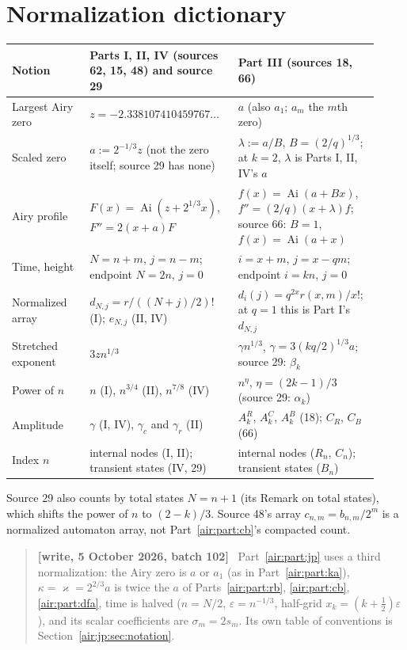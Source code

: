 \documentclass[11pt,letterpaper]{article}
\numberwithin{equation}{section}
\theoremstyle{remark}
\newcommand{\Ai}{\operatorname{Ai}}
\newcommand{\eps}{\varepsilon}
\newenvironment{writenotejp}{\par\smallskip\begin{quote}\small\textbf{[write, 5 October 2026, batch 102]}\ }{\end{quote}\smallskip}
\begin{document}
\section*{Normalization dictionary}
\label{air:guide:normalization}
\begin{center}
\small
\begin{tabular}{@{}>{\raggedright\arraybackslash}p{0.2\linewidth}>{\raggedright\arraybackslash}p{0.36\linewidth}>{\raggedright\arraybackslash}p{0.36\linewidth}@{}}
\toprule
Notion & Parts I, II, IV (sources 62, 15, 48) and source 29 & Part III (sources 18, 66)\\
\midrule
Largest Airy zero & $z=-2.338107410459767\ldots$ & $a$ (also $a_1$; $a_m$ the $m$th zero)\\
Scaled zero & $a:=2^{-1/3}z$ (not the zero itself; source 29 has none) & $\lambda:=a/B$, $B=(2/q)^{1/3}$; at $k=2$, $\lambda$ is Parts I, II, IV's $a$\\
Airy profile & $F(x)=\Ai(z+2^{1/3}x)$, $F''=2(x+a)F$ & $f(x)=\Ai(a+Bx)$, $f''=(2/q)(x+\lambda)f$; source 66: $B=1$, $f(x)=\Ai(a+x)$\\
Time, height & $N=n+m$, $j=n-m$; endpoint $N=2n$, $j=0$ & $i=x+m$, $j=x-qm$; endpoint $i=kn$, $j=0$\\
Normalized array & $d_{N,j}=r/((N+j)/2)!$ (I); $e_{N,j}$ (II, IV) & $d_i(j)=q^{2x}r(x,m)/x!$; at $q=1$ this is Part I's $d_{N,j}$\\
Stretched exponent & $3zn^{1/3}$ & $\gamma n^{1/3}$, $\gamma=3(kq/2)^{1/3}a$; source 29: $\beta_k$\\
Power of $n$ & $n$ (I), $n^{3/4}$ (II), $n^{7/8}$ (IV) & $n^{\eta}$, $\eta=(2k-1)/3$ (source 29: $\alpha_k$)\\
Amplitude & $\gamma$ (I, IV), $\gamma_c$ and $\gamma_r$ (II) & $A_k^R$, $A_k^C$, $A_k^B$ (18); $C_R$, $C_B$ (66)\\
Index $n$ & internal nodes (I, II); transient states (IV, 29) & internal nodes ($R_n$, $C_n$); transient states ($B_n$)\\
\bottomrule
\end{tabular}
\end{center}
Source 29 also counts by total states $N=n+1$ (its Remark on total states), which shifts the power of $n$ to $(2-k)/3$. Source 48's array $c_{n,m}=b_{n,m}/2^m$ is a normalized automaton array, not Part~\ref{air:part:cb}'s compacted count.
\begin{writenotejp}
Part~\ref{air:part:jp} uses a third normalization: the Airy zero is $a$ or $a_1$ (as in Part~\ref{air:part:ka}), $\kappa=\varkappa=2^{2/3}a$ is twice the $a$ of Parts~\ref{air:part:rb}, \ref{air:part:cb}, \ref{air:part:dfa}, time is halved ($n=N/2$, $\eps=n^{-1/3}$, half-grid $x_k=(k+\frac12)\eps$), and its scalar coefficients are $\sigma_m=2s_m$. Its own table of conventions is Section~\ref{air:jp:sec:notation}.
\end{writenotejp}
\end{document}
